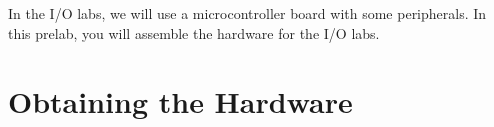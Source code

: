 


\usepackage{enumitem}
\usepackage{graphicx}
\usepackage{addfont}
\usepackage[normalem]{ulem}
\usepackage{subfig}
\usepackage{wrapfig}
\usepackage{animate}
\usepackage{multicol}

\renewcommand{\labnumber}{\hardwareprelabnumber}
\renewcommand{\labname}{Physical Assembly of Hardware for I/O Labs}
\renewcommand{\shortlabname}{i/o-prelab}
\renewcommand{\collaborationrules}{\hardwareprelabcollaboration}
\renewcommand{\duedate}{\hardwareprelabdue}

\newcommand{\nano}{\developmentboard} %
\newcommand{\power}{{power~(\color{red}\bf+}) rail}
\newcommand{\ground}{ground~({\color{RoyalBlue}\bf--}) rail}
\newcommand{\checkpoint}[1]{\stepcounter{checkpoint}\vspace{1cm}
\textbf{\textsc{CheckPoint}~\thecheckpoint:} Before proceeding further, have a
TA or a classmate verify that you have correctly #1. Update
\textit{checkpoints.txt} file to indicate who checked your work and when they
did so.\vspace{1cm}}
\newcommand{\disconnect}{\textbf{Before proceeding further, disconnect the USB
cable from the \nano.}}
\newcommand{\rainbow}{male-to-male rainbow cable}

\pagelayout

\labidentifier


In the I/O labs, we will use a microcontroller board with some peripherals. In
this prelab, you will assemble the hardware for the I/O labs.

\section{Obtaining the Hardware}

